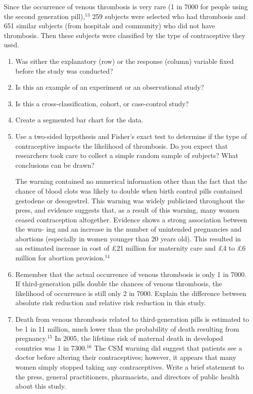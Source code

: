 \documentclass[
]{report}
\begin{document}
\begin{enumerate}
Since the occurrence of venous thrombosis is very rare (1 in 7000 for people using the second
generation pill),$^{13}$ 259 subjects were selected who had thrombosis and 651 similar subjects (from
hospitals and community) who did not have thrombosis. Then these subjects were classified by the
type of contraceptive they used.

  \begin{enumerate}
    \item Was either the explanatory (row) or the response (column) variable fixed before the study was conducted?
    \item Is this an example of an experiment or an observational study?
    \item Is this a cross-classification, cohort, or case-control study?
    \item Create a segmented bar chart for the data.
    \item Use a two-sided hypothesis and Fisher’s exact test to determine if the type of contraceptive impacts the likelihood of thrombosis. Do you expect that researchers took care to collect a simple random sample of subjects? What conclusions can be drawn?
    
    The warning contained no numerical information other than the fact that the chance of blood clots
was likely to double when birth control pills contained gestodene or desogestrel. This warning was
widely publicized throughout the press, and evidence suggests that, as a result of this warning, many
women ceased contraception altogether. Evidence shows a strong association between the warn-
ing and an increase in the number of unintended pregnancies and abortions (especially in women
younger than 20 years old). This resulted in an estimated increase in cost of £21 million for maternity
care and £4 to £6 million for abortion provision.$^{14}$
    \item Remember that the actual occurrence of venous thrombosis is only 1 in 7000. If third-generation pills double the chances of venous thrombosis, the likelihood of occurrence is still only 2 in 7000. Explain the difference between absolute risk reduction and relative risk reduction in this study.
    \item Death from venous thrombosis related to third-generation pills is estimated to be 1 in 11 million, much lower than the probability of death resulting from pregnancy.$^{15}$ In 2005, the lifetime risk of maternal death in developed countries was 1 in 7300.$^{16}$ The CSM warning did suggest that patients see a doctor before altering their contraceptives; however, it appears that many women simply stopped taking any contraceptives. Write a brief statement to the press, general practitioners, pharmacists, and directors of public health about this study.
  \end{enumerate}


\end{enumerate}
\end{document}
